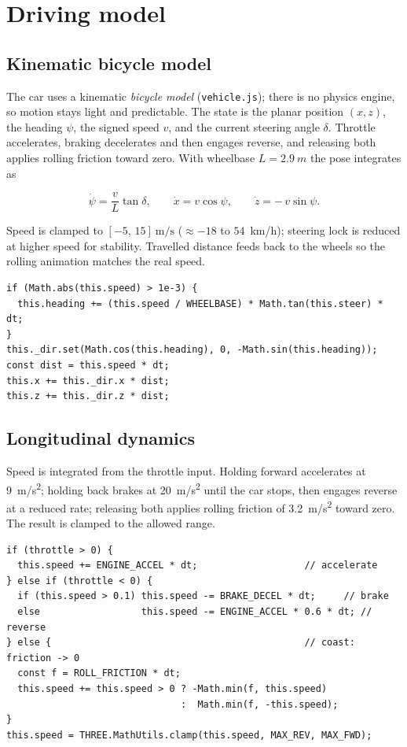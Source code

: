\documentclass[11pt]{article}
\newcommand{\code}[1]{\texttt{#1}}
\begin{document}
\section{Driving model}
\label{sec:terrain}

\subsection{Kinematic bicycle model}

The car uses a kinematic \emph{bicycle model} (\code{vehicle.js}); there is no
physics engine, so motion stays light and predictable. The state is the planar
position $(x,z)$, the heading $\psi$, the signed speed $v$, and the current
steering angle $\delta$. Throttle accelerates, braking decelerates and then
engages reverse, and releasing both applies rolling friction toward zero.
With wheelbase $L=\SI{2.9}{m}$ the pose integrates as

\[
  \dot{\psi} = \frac{v}{L}\tan\delta,
  \qquad
  \dot{x} = v\cos\psi,
  \qquad
  \dot{z} = -\,v\sin\psi .
\]

Speed is clamped to $[-5,\,15]\ \mathrm{m/s}$ ($\approx -18$ to $54$~km/h);
steering lock is reduced at higher speed for stability. Travelled distance feeds
back to the wheels so the rolling animation matches the real speed.

\begin{lstlisting}[caption={Pose integration (\code{vehicle.js}).}]
if (Math.abs(this.speed) > 1e-3) {
  this.heading += (this.speed / WHEELBASE) * Math.tan(this.steer) * dt;
}
this._dir.set(Math.cos(this.heading), 0, -Math.sin(this.heading));
const dist = this.speed * dt;
this.x += this._dir.x * dist;
this.z += this._dir.z * dist;
\end{lstlisting}

\subsection{Longitudinal dynamics}

Speed is integrated from the throttle input. Holding forward accelerates at
\SI{9}{m/s^2}; holding back brakes at \SI{20}{m/s^2} until the car stops, then
engages reverse at a reduced rate; releasing both applies rolling friction of
\SI{3.2}{m/s^2} toward zero. The result is clamped to the allowed range.

\begin{lstlisting}[caption={Longitudinal model (\code{vehicle.js}).}]
if (throttle > 0) {
  this.speed += ENGINE_ACCEL * dt;                   // accelerate
} else if (throttle < 0) {
  if (this.speed > 0.1) this.speed -= BRAKE_DECEL * dt;     // brake
  else                  this.speed -= ENGINE_ACCEL * 0.6 * dt; // reverse
} else {                                             // coast: friction -> 0
  const f = ROLL_FRICTION * dt;
  this.speed += this.speed > 0 ? -Math.min(f, this.speed)
                               :  Math.min(f, -this.speed);
}
this.speed = THREE.MathUtils.clamp(this.speed, MAX_REV, MAX_FWD);
\end{lstlisting}
\end{document}
